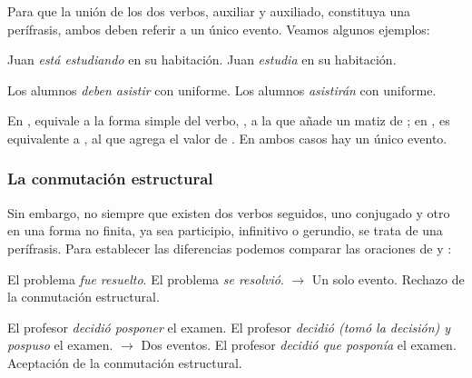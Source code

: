 Para que la unión de los dos verbos, auxiliar y auxiliado, constituya una
perífrasis, ambos deben referir a un único evento. Veamos algunos ejemplos:

\begin{exe}
  \ex\label{ex:11-juan}
    \begin{xlist}
      \ex\label{ex:11-juan-a} Juan \textit{está estudiando} en su habitación.
      \ex\label{ex:11-juan-b} Juan \textit{estudia} en su habitación.
    \end{xlist}
  \ex\label{ex:11-alumnos}
    \begin{xlist}
      \ex\label{ex:11-alumnos-a} Los alumnos \textit{deben asistir} con uniforme.
      \ex\label{ex:11-alumnos-b} Los alumnos \textit{asistirán} con uniforme.
    \end{xlist}
\end{exe}

En ,  equivale a la forma simple del
verbo,  , a la que añade un matiz de
; en ,  es equivalente
a  , al que agrega el valor de
. En ambos casos hay un único evento.

\subsubsection{La conmutación estructural}\label{sec:11-estructural}

Sin embargo, no siempre que existen dos verbos seguidos, uno conjugado y otro en
una forma no finita, ya sea participio, infinitivo o gerundio, se trata de una
perífrasis. Para establecer las diferencias podemos comparar las oraciones de
 y :

\begin{exe}
  \ex\label{ex:11-problema}
    \begin{xlist}
      \ex\label{ex:11-problema-a} El problema \textit{fue resuelto}.
      \ex\label{ex:11-problema-b} El problema \textit{se resolvió}. $\rightarrow$
          Un solo evento.
          Rechazo de la conmutación estructural.
    \end{xlist}
  \ex\label{ex:11-profesor}
    \begin{xlist}
      \ex\label{ex:11-profesor-a} El profesor \textit{decidió posponer} el
          examen.
      \ex\label{ex:11-profesor-b} El profesor \textit{decidió (tomó la decisión) y
          pospuso} el examen. $\rightarrow$ Dos eventos.
      \ex\label{ex:11-profesor-c} El profesor \textit{decidió que posponía} el
          examen. Aceptación de la conmutación estructural.
    \end{xlist}
\end{exe}

